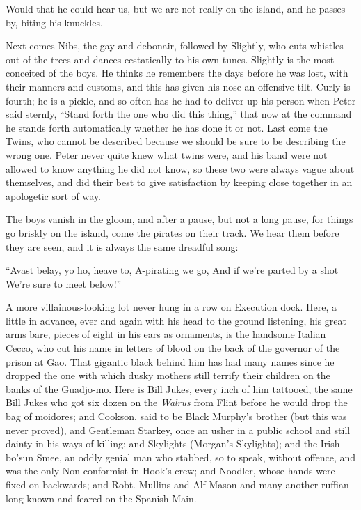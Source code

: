 Would that he could hear us, but we are not really on the island, and
he passes by, biting his knuckles.

Next comes Nibs, the gay and debonair, followed by Slightly, who cuts
whistles out of the trees and dances ecstatically to his own tunes.
Slightly is the most conceited of the boys. He thinks he remembers the
days before he was lost, with their manners and customs, and this has
given his nose an offensive tilt. Curly is fourth; he is a pickle, and
so often has he had to deliver up his person when Peter said sternly,
``Stand forth the one who did this thing,'' that now at the command he
stands forth automatically whether he has done it or not. Last come the
Twins, who cannot be described because we should be sure to be
describing the wrong one. Peter never quite knew what twins were, and
his band were not allowed to know anything he did not know, so these
two were always vague about themselves, and did their best to give
satisfaction by keeping close together in an apologetic sort of way.

The boys vanish in the gloom, and after a pause, but not a long pause,
for things go briskly on the island, come the pirates on their track.
We hear them before they are seen, and it is always the same dreadful
song:

``Avast belay, yo ho, heave to,
    A-pirating we go,
And if we're parted by a shot
    We're sure to meet below!''

A more villainous-looking lot never hung in a row on Execution dock.
Here, a little in advance, ever and again with his head to the ground
listening, his great arms bare, pieces of eight in his ears as
ornaments, is the handsome Italian Cecco, who cut his name in letters
of blood on the back of the governor of the prison at Gao. That
gigantic black behind him has had many names since he dropped the one
with which dusky mothers still terrify their children on the banks of
the Guadjo-mo. Here is Bill Jukes, every inch of him tattooed, the same
Bill Jukes who got six dozen on the \emph{Walrus} from Flint before he would
drop the bag of moidores; and Cookson, said to be Black Murphy's
brother (but this was never proved), and Gentleman Starkey, once an
usher in a public school and still dainty in his ways of killing; and
Skylights (Morgan's Skylights); and the Irish bo'sun Smee, an oddly
genial man who stabbed, so to speak, without offence, and was the only
Non-conformist in Hook's crew; and Noodler, whose hands were fixed on
backwards; and Robt. Mullins and Alf Mason and many another ruffian
long known and feared on the Spanish Main.

